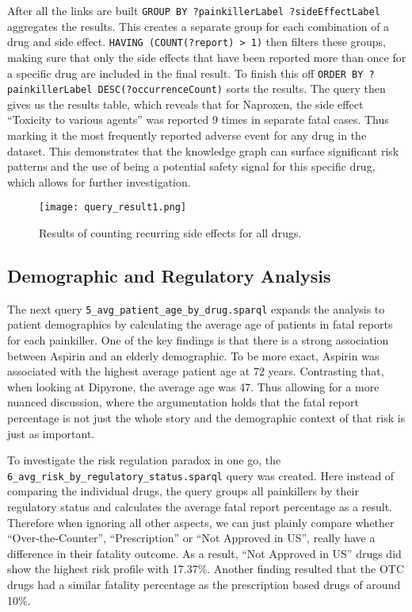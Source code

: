 After all the links are built  \nolinkurl{GROUP BY ?painkillerLabel ?sideEffectLabel} aggregates the results. This creates a separate group for each combination of a drug and side effect. \nolinkurl{HAVING (COUNT(?report) > 1)} then filters these groups, making sure that only the side effects that have been reported more than once for a specific drug are included in the final result.
To finish this off \nolinkurl{ORDER BY ?painkillerLabel DESC(?occurrenceCount)} sorts the results. The query then gives us the results table, which reveals that for Naproxen, the side effect “Toxicity to various agents” was reported 9 times in separate fatal cases. Thus marking it the most frequently reported adverse event for any drug in the dataset. This demonstrates that the knowledge graph can surface significant risk patterns and the use of being a potential safety signal for this specific drug, which allows for further investigation.

\begin{figure}[H]
\centering
\texttt{[image: query\_result1.png]} %
\caption{Results of counting recurring side effects for all drugs.}
\label{fig:query4_results}
\end{figure}

\subsection{Demographic and Regulatory Analysis}
The next query \nolinkurl{5_avg_patient_age_by_drug.sparql} expands the analysis to patient demographics by calculating the average age of patients in fatal reports for each painkiller. One of the key findings is that there is a strong association between Aspirin and an elderly demographic. To be more exact, Aspirin was associated with the highest average patient age at 72 years. Contrasting that, when looking at Dipyrone, the average age was 47. Thus allowing for a more nuanced discussion, where the argumentation holds that the fatal report percentage is not just the whole story and the demographic context of that risk is just as important.

To investigate the risk regulation paradox in one go, the \nolinkurl{6_avg_risk_by_regulatory_status.sparql} query was created. Here instead of comparing the individual drugs, the query groups all painkillers by their regulatory status and calculates the average fatal report percentage as a result. Therefore when ignoring all other aspects, we can just plainly compare whether “Over-the-Counter”, “Prescription” or “Not Approved in US”, really have a difference in their fatality outcome. As a result,  “Not Approved in US” drugs did show the highest risk profile with 17.37\%. Another finding resulted that the OTC drugs had a similar fatality percentage as the prescription based drugs of around 10\%.

